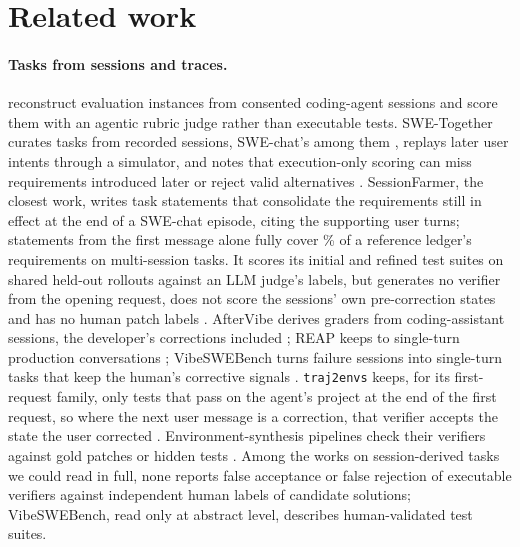 \section{Related work}
\label{sec:related}
\paragraph{Tasks from sessions and traces.} \textcite{trace2eval} reconstruct evaluation instances from consented coding-agent sessions and score them with an agentic rubric judge rather than executable tests. SWE-Together curates tasks from recorded sessions, SWE-chat's among them \cite{swechat}, replays later user intents through a simulator, and notes that execution-only scoring can miss requirements introduced later or reject valid alternatives \cite{swetogether}. SessionFarmer, the closest work, writes task statements that consolidate the requirements still in effect at the end of a SWE-chat episode, citing the supporting user turns; statements from the first message alone fully cover \% of a reference ledger's requirements on multi-session tasks. It scores its initial and refined test suites on shared held-out rollouts against an LLM judge's labels, but generates no verifier from the opening request, does not score the sessions' own pre-correction states and has no human patch labels \cite{lu2026harvesting}. AfterVibe derives graders from coding-assistant sessions, the developer's corrections included \cite{paltenghi2026aftervibe}; REAP keeps to single-turn production conversations \cite{jha2026reap}; VibeSWEBench turns failure sessions into single-turn tasks that keep the human's corrective signals \cite{islam2026vibeswebench}. \texttt{traj2envs} keeps, for its first-request family, only tests that pass on the agent's project at the end of the first request, so where the next user message is a correction, that verifier accepts the state the user corrected \cite{huggingface2026traj2envs}. Environment-synthesis pipelines check their verifiers against gold patches or hidden tests \cite{yang2025swesmith,jain2025r2egym}. Among the works on session-derived tasks we could read in full, none reports false acceptance or false rejection of executable verifiers against independent human labels of candidate solutions; VibeSWEBench, read only at abstract level, describes human-validated test suites.

